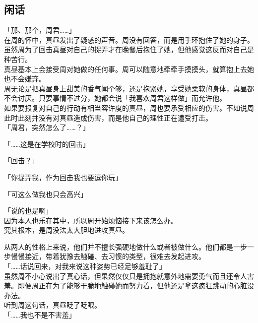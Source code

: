 \subsection{闲话}

「那、那个，周君……」\\

在周的怀中，真昼发出了疑惑的声音。周没有回答，而是用手环抱住了她的身子。\\

虽然周为了回击真昼对自己的捉弄才在晚餐后抱住了她，但他感觉这反而对自己是种苦行。\\

真昼基本上会接受周对她做的任何事。周可以随意地牵牵手摸摸头，就算抱上去她也不会嫌弃。\\

周无论是把真昼身上甜美的香气闻个够，还是抱紧她，享受她柔软的身体，真昼都不会讨厌。只要事情不过分，她都会说「我喜欢周君这样做」而允许他。\\

如果要报复对自己的行动有相当容许度的真昼，周也要承受相应的伤害。不如说周此时此刻并没有对真昼造成伤害，而是他自己的理性正在遭受打击。\\

「周君，突然怎么了……？」

「……这是在学校时的回击」

「回击？」

「你捉弄我，作为回击我也要逗你玩」

「可这么做我也只会高兴」

「说的也是啊」\\

因为本人也乐在其中，所以周开始烦恼接下来该怎么办。\\

究其根本，是周没法太大胆地进攻真昼。

从两人的性格上来说，他们并不擅长强硬地做什么或者被做什么。他们都是一步一步慢慢接近，带着犹豫去触碰、去习惯的类型，很难去发起进攻。\\

「……话说回来，对我来说这种姿势已经足够羞耻了」\\

虽然周不小心说出了真心话，但果然仅仅只是拥抱就意外地需要勇气而且还令人害羞。即便周正在为了能够干脆地触碰她而努力着，但他还是拿这疯狂跳动的心脏没办法。\\

听到周这句话，真昼眨了眨眼。\\

「……我也不是不害羞」

